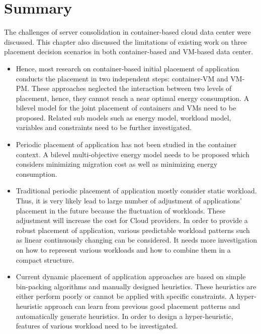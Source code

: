 \section{Summary}

 The challenges of server consolidation in container-based cloud data center were discussed. This chapter also discussed the limitations of existing work on three placement decision scenarios in both container-based and VM-based data center. 

\begin{itemize}
	\item {} Hence, most research on container-based initial placement of application conducts the placement in two independent steps: container-VM and VM-PM. These approaches neglected the interaction between two levels of placement, hence, they cannot reach a near optimal energy consumption. A bilevel model for the joint placement of containers and VMs need to be proposed. Related sub models such as energy model, workload model, variables and constraints need to be further investigated.
	\item Periodic placement of application has not been studied in the container context. A bilevel multi-objective energy model needs to be proposed which considers minimizing migration cost as well as minimizing energy consumption. 
	\item Traditional periodic placement of application mostly consider static workload. Thus, it is very likely lead to large number of adjustment of applications' placement in the future because the fluctuation of workloads. These adjustment will increase the cost for Cloud providers. In order to provide a robust placement of application, various predictable workload patterns such as linear continuously changing can be considered. It needs more investigation on how to represent various workloads and how to combine them in a compact structure.
	\item Current dynamic placement of application approaches are based on simple bin-packing algorithms and manually designed heuristics. These heuristics are either perform poorly or cannot be applied with specific constraints. A hyper-heuristic approach can learn from previous good placement patterns and automatically generate heuristics. In order to design a hyper-heuristic, features of various workload need to be investigated. 
\end{itemize}


